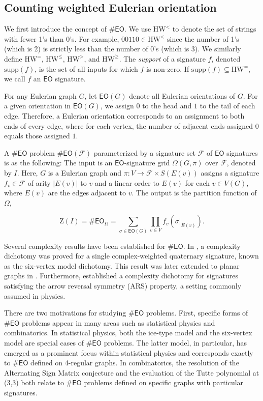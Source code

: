 \documentclass[a4paper,UKenglish,cleveref, autoref, thm-restate]{lipics-v2021}
\newcommand{\eo}[0]{\textsf{EO}}
\newcommand{\hw}[1]{\text{HW}^{#1}}
\newcommand{\su}[0]{\text{supp}}
\begin{document}
\subsection{Counting weighted Eulerian orientation}
We first introduce the concept of $\#\eo$. We use $\hw{<}$ to denote the set of strings with fewer 1's than 0's. For example, $00110\in \hw{<}$ since the number of 1's (which is 2) is strictly less than the number of 0's (which is 3). We similarly define $\hw{=}$, $\hw{\leq}$, $\hw{>}$, and $\hw{\geq}$. 
The \textit{support} of a signature $f$, denoted $\su(f)$, is the set of all inputs for which $f$ is non-zero.  If $\su(f)\subseteq\hw{=}$, we call $f$ an $\eo$ signature. 

For any Eulerian graph $G$, let $\eo(G)$ denote all Eulerian orientations of $G$. For a given orientation in $\eo(G)$, we assign $0$ to the head and $1$ to the tail of each edge. Therefore, a Eulerian orientation corresponds to an assignment to both ends of every edge, where for each vertex, the number of adjacent ends assigned $0$ equals those assigned $1$.


\begin{definition}[{$\#\eo$}]
A $\#\eo$ problem $\#\eo(\mathcal{F})$ parameterized by a signature set $\mathcal{F}$ of $\eo$ signatures is as the following: The input is an $\eo$-signature grid $\Omega(G,\pi)$ over $\mathcal{F}$, denoted by $I$. Here, $G$ is a Eulerian graph and $\pi:V\to \mathcal{F}\times S(E(v))$ assigns a signature $f_v\in\mathcal{F}$ of arity $|E(v)|$ to $v$ and a linear order to $E(v)$ for each $v\in V(G)$, where $E(v)$ are the edges adjacent to $v$. The output is the partition function of $\Omega$,

$$\text{Z}(I)=\#\eo_\Omega=\sum_{\sigma\in\eo(G)}\prod_{v\in V}f_v(\sigma|_{E(v)}).$$
\label{defeo}
\end{definition}


Several complexity results have been established for $\#\eo$. In \cite{cai2018complexity}, a complexity dichotomy was proved for a single complex-weighted quaternary signature, known as the six-vertex model dichotomy. This result was later extended to planar graphs in \cite{cai2021new}. Furthermore, \cite{cai2020beyond} established a complexity dichotomy for signatures satisfying the arrow reversal symmetry (ARS) property, a setting commonly assumed in physics.
 

There are two motivations for studying $\#\eo$ problems. First, specific forms of $\#\eo$ problems appear in many areas such as statistical physics and combinatorics. In statistical physics, both the ice-type model and the six-vertex model \cite{pauling1935structure} are special cases of $\#\eo$ problems. The latter model, in particular, has emerged as a prominent focus within statistical physics and corresponds exactly to $\#\eo$ defined on 4-regular graphs. In combinatorics, the resolution of the Alternating Sign Matrix conjecture \cite{bressoud1999proofs} and the evaluation of the Tutte polynomial at (3,3) \cite{las1988evaluation} both relate to $\#\eo$ problems defined on specific graphs with particular signatures.
\end{document}
